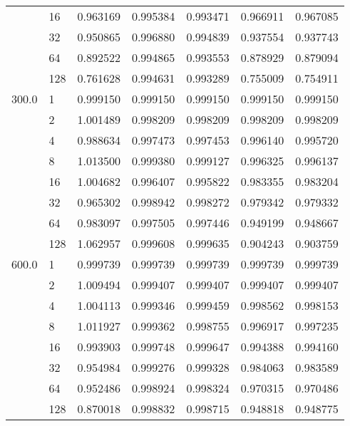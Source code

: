 \begin{tabular}{llrrrrr}
      & 16  &  0.963169 &  0.995384 &  0.993471 &  0.966911 &  0.967085 \\
      & 32  &  0.950865 &  0.996880 &  0.994839 &  0.937554 &  0.937743 \\
      & 64  &  0.892522 &  0.994865 &  0.993553 &  0.878929 &  0.879094 \\
      & 128 &  0.761628 &  0.994631 &  0.993289 &  0.755009 &  0.754911 \\
300.0 & 1   &  0.999150 &  0.999150 &  0.999150 &  0.999150 &  0.999150 \\
      & 2   &  1.001489 &  0.998209 &  0.998209 &  0.998209 &  0.998209 \\
      & 4   &  0.988634 &  0.997473 &  0.997453 &  0.996140 &  0.995720 \\
      & 8   &  1.013500 &  0.999380 &  0.999127 &  0.996325 &  0.996137 \\
      & 16  &  1.004682 &  0.996407 &  0.995822 &  0.983355 &  0.983204 \\
      & 32  &  0.965302 &  0.998942 &  0.998272 &  0.979342 &  0.979332 \\
      & 64  &  0.983097 &  0.997505 &  0.997446 &  0.949199 &  0.948667 \\
      & 128 &  1.062957 &  0.999608 &  0.999635 &  0.904243 &  0.903759 \\
600.0 & 1   &  0.999739 &  0.999739 &  0.999739 &  0.999739 &  0.999739 \\
      & 2   &  1.009494 &  0.999407 &  0.999407 &  0.999407 &  0.999407 \\
      & 4   &  1.004113 &  0.999346 &  0.999459 &  0.998562 &  0.998153 \\
      & 8   &  1.011927 &  0.999362 &  0.998755 &  0.996917 &  0.997235 \\
      & 16  &  0.993903 &  0.999748 &  0.999647 &  0.994388 &  0.994160 \\
      & 32  &  0.954984 &  0.999276 &  0.999328 &  0.984063 &  0.983589 \\
      & 64  &  0.952486 &  0.998924 &  0.998324 &  0.970315 &  0.970486 \\
      & 128 &  0.870018 &  0.998832 &  0.998715 &  0.948818 &  0.948775 \\
\bottomrule
\end{tabular}
